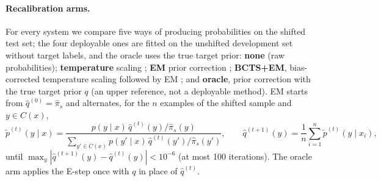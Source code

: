 \paragraph{Recalibration arms.}
For every system we compare five ways of producing probabilities on the shifted test set; the four deployable ones are
fitted on the unshifted development set without target labels, and the oracle uses the true target prior:
\textbf{none} (raw probabilities);
\textbf{temperature} scaling \citep{guo2017calibration};
\textbf{EM} prior correction \citep{saerens2002adjusting};
\textbf{BCTS+EM}, bias-corrected temperature scaling followed by EM \citep{alexandari2020maximum}; and
\textbf{oracle}, prior correction with the true target prior $q$ (an upper reference, not a deployable method).
EM starts from $\hat q^{(0)}=\hat\pi_s$ and alternates, for the $n$ examples of the shifted sample and $y\in C(x)$,
\begin{equation}
  \tilde p^{(t)}(y\mid x)=\frac{p(y\mid x)\,\hat q^{(t)}(y)/\hat\pi_s(y)}
  {\sum_{y'\in C(x)}p(y'\mid x)\,\hat q^{(t)}(y')/\hat\pi_s(y')},\qquad
  \hat q^{(t+1)}(y)=\frac{1}{n}\sum_{i=1}^{n}\tilde p^{(t)}(y\mid x_i),
  \label{eq:em}
\end{equation}
until $\max_y|\hat q^{(t+1)}(y)-\hat q^{(t)}(y)|<10^{-6}$ (at most 100 iterations). The oracle arm applies the E-step
once with $q$ in place of $\hat q^{(t)}$.

